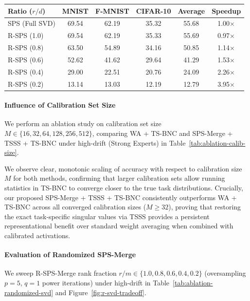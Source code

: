 \documentclass{article}
\theoremstyle{plain}
\theoremstyle{definition}
\theoremstyle{remark}
\begin{document}
\begin{table}[t]
\begin{minipage}{0.48\textwidth}
\begin{tabular}{lccccc}
\toprule
Ratio ($r/d$) & MNIST & F-MNIST & CIFAR-10 & Average & Speedup \\
\midrule
SPS (Full SVD) & 69.54 & 62.19 & 35.32 & 55.68 & 1.00$\times$ \\
\midrule
R-SPS (1.0) & 69.54 & 62.19 & 35.33 & 55.69 & 0.97$\times$ \\
R-SPS (0.8) & 63.50 & 54.89 & 34.16 & 50.85 & 1.14$\times$ \\
R-SPS (0.6) & 52.62 & 41.62 & 29.64 & 41.29 & 1.53$\times$ \\
R-SPS (0.4) & 29.00 & 22.51 & 20.76 & 24.09 & 2.26$\times$ \\
R-SPS (0.2) & 13.14 & 13.03 & 12.19 & 12.79 & 3.95$\times$ \\
\bottomrule
\end{tabular}
\end{minipage}
\vspace{-3mm}
\end{table}

\paragraph{Influence of Calibration Set Size}
We perform an ablation study on calibration set size $M \in \{16, 32, 64, 128, 256, 512\}$, comparing WA + TS-BNC and SPS-Merge + TSSS + TS-BNC under high-drift (Strong Experts) in Table~\ref{tab:ablation-calib-size}.

We observe clear, monotonic scaling of accuracy with respect to calibration size $M$ for both methods, confirming that larger calibration sets allow running statistics in TS-BNC to converge closer to the true task distributions. Crucially, our proposed SPS-Merge + TSSS + TS-BNC consistently outperforms WA + TS-BNC across all converged calibration sizes ($M \ge 32$), proving that restoring the exact task-specific singular values via TSSS provides a persistent representational benefit over standard weight averaging when combined with calibrated activations.

\paragraph{Evaluation of Randomized SPS-Merge}
We sweep R-SPS-Merge rank fraction $r / m \in \{1.0, 0.8, 0.6, 0.4, 0.2\}$ (oversampling $p=5$, $q=1$ power iterations) under high-drift in Table~\ref{tab:ablation-randomized-svd} and Figure~\ref{fig:r-svd-tradeoff}.
\end{document}
